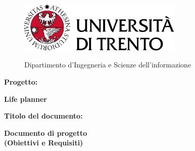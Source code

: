 \begin{titlepage}
    \begin{figure}[!htb]
        \includegraphics[width=0.7\textwidth]{img/logo_unitn.png}
        \endminipage
        \hfill
        \begin{flushright}
            \Large
            Dipartimento d'Ingegneria e Scienze dell'informazione
        \end{flushright}
        \endminipage
        \hfill
    \end{figure}

    \vspace{6cm}

    \large
    \textbf{Progetto:}
    \begin{center}
        \Huge
        \color{blue}
        \textbf{Life planner}
    \end{center}

    \vspace{1cm}

    \textbf{Titolo del documento:}
    \begin{center}
        \huge
        \color{blue}
        \textbf{Documento di progetto}\\
        \textbf{(Obiettivi e Requisiti)}
    \end{center}


    
\end{titlepage}